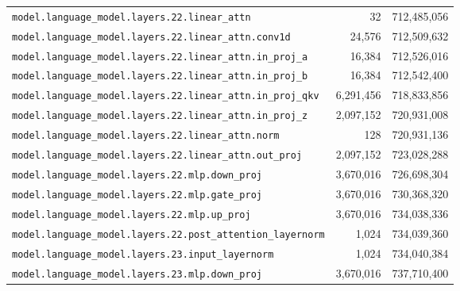\documentclass[10pt,a4paper]{article}
\theoremstyle{definition}
\begin{document}
\begin{appendices}
\begin{longtable}{p{9.5cm}rr}
\texttt{model.\allowbreak{}language\_model.\allowbreak{}layers.\allowbreak{}22.\allowbreak{}linear\_attn} & 32 & 712,485,056 \\
\texttt{model.\allowbreak{}language\_model.\allowbreak{}layers.\allowbreak{}22.\allowbreak{}linear\_attn.\allowbreak{}conv1d} & 24,576 & 712,509,632 \\
\texttt{model.\allowbreak{}language\_model.\allowbreak{}layers.\allowbreak{}22.\allowbreak{}linear\_attn.\allowbreak{}in\_proj\_a} & 16,384 & 712,526,016 \\
\texttt{model.\allowbreak{}language\_model.\allowbreak{}layers.\allowbreak{}22.\allowbreak{}linear\_attn.\allowbreak{}in\_proj\_b} & 16,384 & 712,542,400 \\
\texttt{model.\allowbreak{}language\_model.\allowbreak{}layers.\allowbreak{}22.\allowbreak{}linear\_attn.\allowbreak{}in\_proj\_qkv} & 6,291,456 & 718,833,856 \\
\texttt{model.\allowbreak{}language\_model.\allowbreak{}layers.\allowbreak{}22.\allowbreak{}linear\_attn.\allowbreak{}in\_proj\_z} & 2,097,152 & 720,931,008 \\
\texttt{model.\allowbreak{}language\_model.\allowbreak{}layers.\allowbreak{}22.\allowbreak{}linear\_attn.\allowbreak{}norm} & 128 & 720,931,136 \\
\texttt{model.\allowbreak{}language\_model.\allowbreak{}layers.\allowbreak{}22.\allowbreak{}linear\_attn.\allowbreak{}out\_proj} & 2,097,152 & 723,028,288 \\
\texttt{model.\allowbreak{}language\_model.\allowbreak{}layers.\allowbreak{}22.\allowbreak{}mlp.\allowbreak{}down\_proj} & 3,670,016 & 726,698,304 \\
\texttt{model.\allowbreak{}language\_model.\allowbreak{}layers.\allowbreak{}22.\allowbreak{}mlp.\allowbreak{}gate\_proj} & 3,670,016 & 730,368,320 \\
\texttt{model.\allowbreak{}language\_model.\allowbreak{}layers.\allowbreak{}22.\allowbreak{}mlp.\allowbreak{}up\_proj} & 3,670,016 & 734,038,336 \\
\texttt{model.\allowbreak{}language\_model.\allowbreak{}layers.\allowbreak{}22.\allowbreak{}post\_attention\_layernorm} & 1,024 & 734,039,360 \\
\texttt{model.\allowbreak{}language\_model.\allowbreak{}layers.\allowbreak{}23.\allowbreak{}input\_layernorm} & 1,024 & 734,040,384 \\
\texttt{model.\allowbreak{}language\_model.\allowbreak{}layers.\allowbreak{}23.\allowbreak{}mlp.\allowbreak{}down\_proj} & 3,670,016 & 737,710,400 \\

\end{longtable}
\end{appendices}
\end{document}

